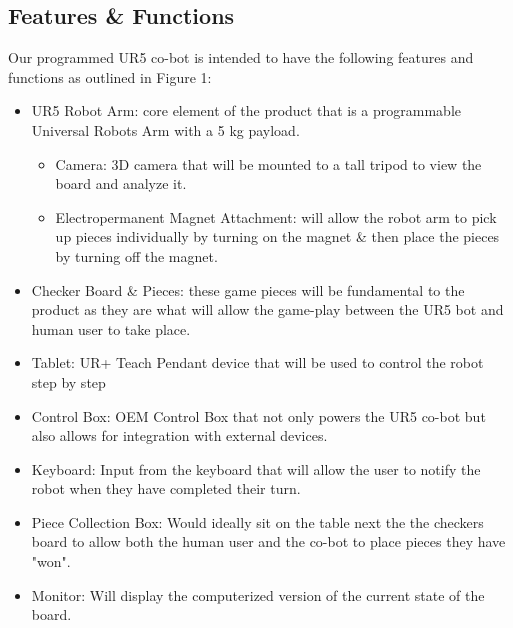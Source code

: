 \subsection{Features \& Functions}
Our programmed UR5 co-bot is intended to have the following features and functions as outlined in Figure 1:
\begin{itemize}
  \item UR5 Robot Arm: core element of the product that is a programmable Universal Robots Arm with a 5 kg payload.
  \begin{itemize}
      \item Camera: 3D camera that will be mounted to a tall tripod to view the board and analyze it.
      \item Electropermanent Magnet Attachment: will allow the robot arm to pick up pieces individually by turning on the magnet \& then place the pieces by turning off the magnet.
  \end{itemize}
  \item Checker Board \& Pieces: these game pieces will be fundamental to the product as they are what will allow the game-play between the UR5 bot and human user to take place.
  \item Tablet: UR+ Teach Pendant device that will be used to control the robot step by step
  \item Control Box: OEM Control Box that not only powers the UR5 co-bot but also allows for integration with external devices.
  \item Keyboard: Input from the keyboard that will allow the user to notify the robot when they have completed their turn.
  \item Piece Collection Box: Would ideally sit on the table next the the checkers board to allow both the human user and the co-bot to place pieces they have "won".
  \item Monitor: Will display the computerized version of the current state of the board.
\end{itemize}

